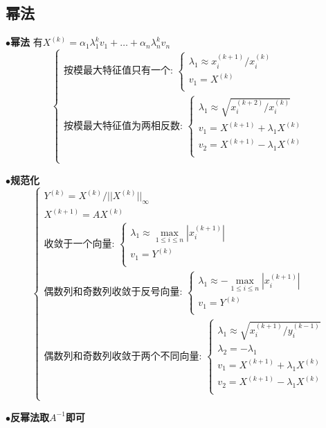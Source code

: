 \documentclass[UTF8]{article}
\newcommand{\keypoint}[2]{$\bullet$\textbf{#1}\quad#2\par}
\begin{document}
\subsection{幂法}
\keypoint{幂法}{
	有$X^{(k)}=\alpha_1\lambda_1^kv_1+\dots+\alpha_n\lambda_n^kv_n$
	$$
	\left\{
	\begin{array}{l}
	\mbox{按模最大特征值只有一个: }
	\left\{
	\begin{array}{l}
		\lambda_1\approx x_i^{(k+1)}/x_i^{(k)}\\
		v_1=X^{(k)}\\
	\end{array}
	\right.\\
	
	\mbox{按模最大特征值为两相反数: }
	\left\{
	\begin{array}{l}
		\lambda_1\approx \sqrt{x_i^{(k+2)}/x_i^{(k)}}\\
		v_1=X^{(k+1)}+\lambda_1X^{(k)}\\
		v_2=X^{(k+1)}-\lambda_1X^{(k)}\\
	\end{array}
	\right.\\
	
	\end{array}
	\right.
	$$
}
\keypoint{规范化}{
	$$
	\left\{
	\begin{array}{l}
	Y^{(k)}=X^{(k)}/||X^{(k)}||_\infty\\
	X^{(k+1)}=AX^{(k)}\\
	\mbox{收敛于一个向量: }
	\left\{
	\begin{array}{l}
	\lambda_1\approx \max\limits_{1\leq i\leq n}|x_{i}^{(k+1)}|\\
	v_1=Y^{(k)}\\
	\end{array}
	\right.\\
	\mbox{偶数列和奇数列收敛于反号向量: }
	\left\{
	\begin{array}{l}
	\lambda_1\approx -\max\limits_{1\leq i\leq n}|x_{i}^{(k+1)}|\\
	v_1=Y^{(k)}\\
	\end{array}
	\right.\\
	\mbox{偶数列和奇数列收敛于两个不同向量: }
	\left\{
	\begin{array}{l}
	\lambda_1\approx \sqrt{x_i^{(k+1)}/y_i^{(k-1)}}\\
	\lambda_2=-\lambda_1\\
	v_1=X^{(k+1)}+\lambda_1X^{(k)}\\
	v_2=X^{(k+1)}-\lambda_1X^{(k)}\\
	\end{array}
	\right.\\
	\end{array}
	\right.
	$$
}
\keypoint{反幂法取$A^{-1}$即可}{}
\end{document}
